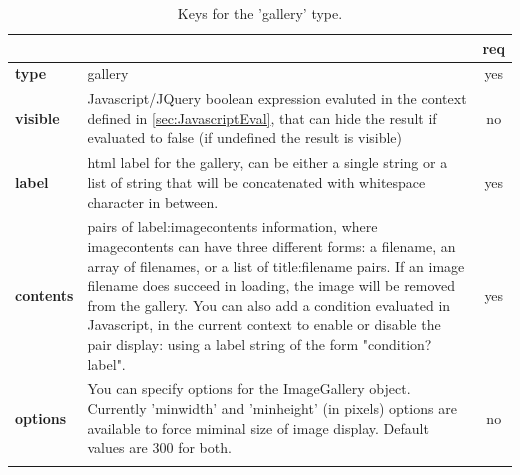 \begin{longtable}{|>{\bf}L{\linewidth}|L{\linewidth}|c|}
\hline
      &  & {\bf req} 
\tabularnewline \hline \hline
 type       & gallery  & yes \\ \hline
 visible    & Javascript/JQuery boolean expression evaluted in the context 
              defined in \ref{sec:JavascriptEval}, that can hide the result if
              evaluated to false (if undefined the result is visible)& no \\ \hline
 label      & html label for the gallery, can be either a single string or 
             a list of string that will be concatenated with whitespace character
              in between. & yes \\ \hline
 contents   & pairs of label:imagecontents information, where imagecontents can 
              have three different forms: a filename, an array of filenames, or
              a list of title:filename pairs. 
              If an image filename does succeed in loading,
              the image will be removed from the gallery. 
              You can also add a condition evaluated in Javascript,
              in the current context to enable or disable the pair display:
              using a label string of the form "condition?label".
            & yes \\ \hline
 options    & You can specify options for the ImageGallery object. Currently
              'minwidth' and 'minheight' (in pixels) options are available to force
              miminal size of image display. Default values are 300 for both.& no \\ \hline
\caption{Keys for the 'gallery' type.}
\end{longtable}

